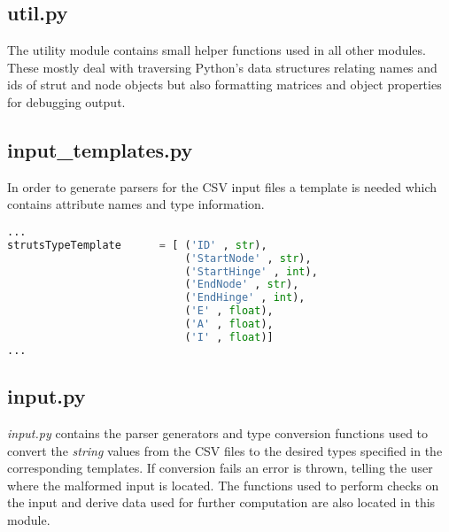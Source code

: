 \subsection{util.py}
\label{subsec:util.py}

The utility module contains small helper functions used in all other modules.
These mostly deal with traversing Python's data structures relating names and ids of strut and node objects but also formatting matrices and object properties for debugging output.

\pagebreak

\subsection{input\_templates.py}
\label{subsec:inputtemplates.py}

In order to generate parsers for the CSV input files a template is needed which contains attribute names and type information.

\begin{inconsolata}
\begin{minipage}{\linewidth}
\begin{lstlisting}[language=python]
...
strutsTypeTemplate      = [ ('ID' , str),
                            ('StartNode' , str),
                            ('StartHinge' , int),
                            ('EndNode' , str),
                            ('EndHinge' , int),
                            ('E' , float),
                            ('A' , float),
                            ('I' , float)]
...
\end{lstlisting}
\end{minipage}
\end{inconsolata}

\subsection{input.py}
\label{subsec:input.py}

\textit{input.py} contains the parser generators and type conversion functions used to convert the \textit{string} values from the CSV files to the desired types specified in the corresponding templates.
If conversion fails an error is thrown, telling the user where the malformed input is located.
The functions used to perform checks on the input and derive data used for further computation are also located in this module.

